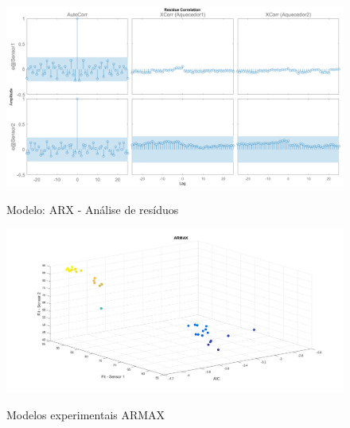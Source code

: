 \begin{apendicesenv}
\begin{figure}
	\caption{Modelo: ARX - Análise de resíduos}
	\begin{center}
		\includegraphics[width=1.00\textwidth]{./5_images/tclabsp-models-ARX-resid.png} 
		\label{fig:tclabsp-models-arx-resid}
	\end{center}
	\centering
\end{figure}

\begin{figure}[h]
	\caption{Modelos experimentais ARMAX}
	\begin{center}
		\includegraphics[width=1.00\textwidth]{./5_images/tclabsp-models-ARMAX.png} 
		\label{fig:tclabsp-models-armax}
	\end{center}
	\centering
\end{figure}


\end{apendicesenv}
